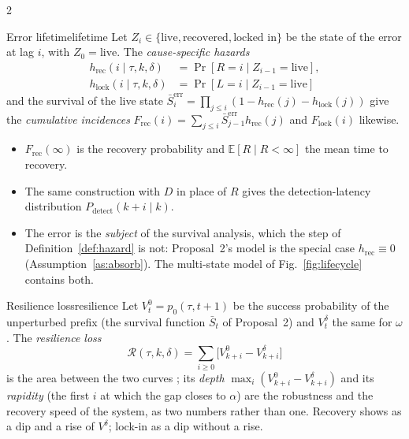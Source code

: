 \begin{multicols}{2}
\begin{definition}{Error lifetime}{lifetime}
Let $Z_i\in\{\text{live},\text{recovered},\text{locked in}\}$ be the state of the error at lag $i$, with $Z_0=\text{live}$. The \emph{cause-specific hazards}
\begin{align*}
h_{\mathrm{rec}}(i\mid\tau,k,\delta)&=\Pr[R{=}i\mid Z_{i-1}{=}\text{live}],\\
h_{\mathrm{lock}}(i\mid\tau,k,\delta)&=\Pr[L{=}i\mid Z_{i-1}{=}\text{live}]
\end{align*}
and the survival of the live state $\bar S^{\mathrm{err}}_i=\prod_{j\le i}(1-h_{\mathrm{rec}}(j)-h_{\mathrm{lock}}(j))$ give the \emph{cumulative incidences} $F_{\mathrm{rec}}(i)=\sum_{j\le i}\bar S^{\mathrm{err}}_{j-1}h_{\mathrm{rec}}(j)$ and $F_{\mathrm{lock}}(i)$ likewise.
\begin{itemize}[leftmargin=1.1em]
\item $F_{\mathrm{rec}}(\infty)$ is the recovery probability and $\mathbb{E}[R\mid R<\infty]$ the mean time to recovery.
\item The same construction with $D$ in place of $R$ gives the detection-latency distribution $P_{\mathrm{detect}}(k{+}i\mid k)$.
\item The error is the \emph{subject} of the survival analysis, which the step of Definition~\ref{def:hazard} is not: Proposal~2's model is the special case $h_{\mathrm{rec}}\equiv0$ (Assumption~\ref{as:absorb}). The multi-state model of Fig.~\ref{fig:lifecycle} contains both.
\end{itemize}
\end{definition}

\begin{definition}{Resilience loss}{resilience}
Let $V^0_t=p_0(\tau,t{+}1)$ be the success probability of the unperturbed prefix (the survival function $\bar S_t$ of Proposal~2) and $V^\delta_t$ the same for $\omega$. The \emph{resilience loss}
\[\mathcal{R}(\tau,k,\delta)=\sum_{i\ge0}\big[V^0_{k+i}-V^\delta_{k+i}\big]\]
is the area between the two curves \cite{bruneau2003resilience}; its \emph{depth} $\max_i(V^0_{k+i}-V^\delta_{k+i})$ and its \emph{rapidity} (the first $i$ at which the gap closes to $\alpha$) are the robustness and the recovery speed of the system, as two numbers rather than one. Recovery shows as a dip and a rise of $V^\delta$; lock-in as a dip without a rise.
\end{definition}


\end{multicols}
